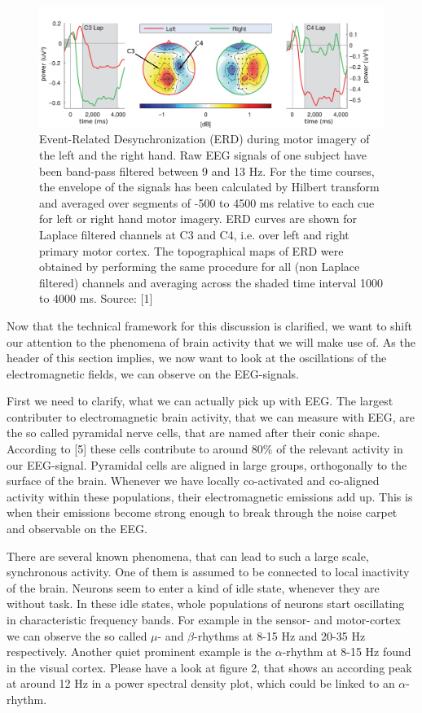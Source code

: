 \documentclass[12pt,twoside,twocolumn]{article}
\begin{document}
\begin{figure}
  \includegraphics[scale=0.32]{spectralrarr.png}
  \caption{Event-Related Desynchronization (ERD) during motor imagery of the left and the right hand. Raw EEG signals of one subject have been band-pass filtered between 9 and 13 Hz. For the time courses, the envelope of the signals has been calculated by Hilbert transform and averaged over segments of -500 to 4500 ms relative to each cue for left or right hand motor imagery. ERD curves are shown for Laplace filtered channels at C3 and C4, i.e. over left and right primary motor cortex. The topographical maps of ERD were obtained by performing the same procedure for all (non Laplace filtered) channels and averaging across the shaded time interval 1000 to 4000 ms. Source: [1]}
\end{figure}

Now that the technical framework for this discussion is clarified, we want to shift our attention to the phenomena of brain activity that we will make use of. 
As the header of this section implies, we now want to look at the oscillations of the electromagnetic fields, we can observe on the EEG-signals. 

First we need to clarify, what we can actually pick up with EEG. The largest contributer to electromagnetic brain activity, that we can measure with EEG, are the so called pyramidal nerve cells, that are named after their conic shape. According to [5] these cells contribute to around 80\% of the relevant activity in our EEG-signal. Pyramidal cells are aligned in large groups, orthogonally to the surface of the brain. Whenever we have locally co-activated and co-aligned activity within these populations, their electromagnetic emissions add up. This is when their emissions become strong enough to break through the noise carpet and observable on the EEG. 

There are several known phenomena, that can lead to such a large scale, synchronous activity. One of them is assumed to be connected to local inactivity of the brain. Neurons seem to enter a kind of idle state, whenever they are without task. In these idle states, whole populations of neurons start oscillating in characteristic frequency bands. For example in the sensor- and motor-cortex we can observe the so called $\mu$- and $\beta$-rhythms at 8-15 Hz and 20-35 Hz respectively. Another quiet prominent example is the $\alpha$-rhythm at 8-15 Hz found in the visual cortex. Please have a look at figure 2, that shows an according peak at around 12 Hz in a power spectral density plot, which could be linked to an $\alpha$-rhythm. 
\end{document}
